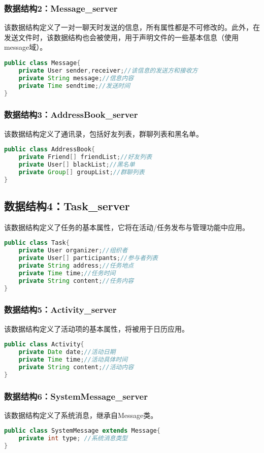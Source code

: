 \subsubsection{数据结构2：Message\_server}
该数据结构定义了一对一聊天时发送的信息，所有属性都是不可修改的。此外，在发送文件时，该数据结构也会被使用，用于声明文件的一些基本信息（使用message域）。
\begin{lstlisting}[language=Java, caption=Message定义]
public class Message{
    private User sender,receiver;//该信息的发送方和接收方
    private String message;//信息内容
    private Time sendtime;//发送时间
}
\end{lstlisting}


\subsubsection{数据结构3：AddressBook\_server}
该数据结构定义了通讯录，包括好友列表，群聊列表和黑名单。
\begin{lstlisting}[language=Java, caption=AddressBook定义]
public class AddressBook{
    private Friend[] friendList;//好友列表
    private User[] blackList;//黑名单
    private Group[] groupList;//群聊列表
}
\end{lstlisting}

\subsection{数据结构4：Task\_server}
该数据结构定义了任务的基本属性，它将在活动/任务发布与管理功能中应用。
\begin{lstlisting}[language=Java, caption=Task定义]
public class Task{
    private User organizer;//组织者
    private User[] participants;//参与者列表
    private String address;//任务地点
    private Time time;//任务时间
    private String content;//任务内容
}
\end{lstlisting}

\subsubsection{数据结构5：Activity\_server}
该数据结构定义了活动项的基本属性，将被用于日历应用。
\begin{lstlisting}[language=Java, caption=Activity定义]
public class Activity{
    private Date date;//活动日期
    private Time time;//活动具体时间
    private String content;//活动内容
}
\end{lstlisting}

\subsubsection{数据结构6：SystemMessage\_server}
该数据结构定义了系统消息，继承自Message类。
\begin{lstlisting}[language=Java, caption=SystemMessage定义]
public class SystemMessage extends Message{
    private int type; //系统消息类型
}
\end{lstlisting}

